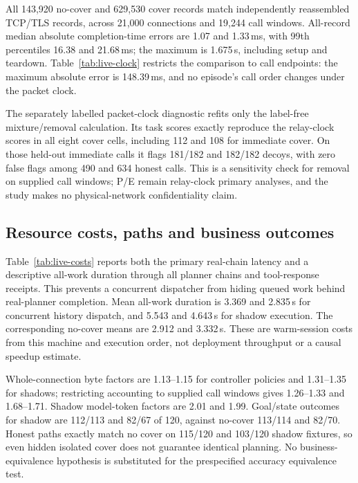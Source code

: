 All 143,920 no-cover and 629,530 cover records match independently reassembled TCP/TLS records, across 21,000 connections and 19,244 call windows. All-record median absolute completion-time errors are 1.07 and 1.33\,ms, with 99th percentiles 16.38 and 21.68\,ms; the maximum is 1.675\,s, including setup and teardown. Table~\ref{tab:live-clock} restricts the comparison to call endpoints: the maximum absolute error is 148.39\,ms, and no episode's call order changes under the packet clock.

The separately labelled packet-clock diagnostic refits only the label-free mixture/removal calculation. Its task scores exactly reproduce the relay-clock scores in all eight cover cells, including 112 and 108 for immediate cover. On those held-out immediate calls it flags 181/182 and 182/182 decoys, with zero false flags among 490 and 634 honest calls. This is a sensitivity check for removal on supplied call windows; P/E remain relay-clock primary analyses, and the study makes no physical-network confidentiality claim.




\subsection{Resource costs, paths and business outcomes}
Table~\ref{tab:live-costs} reports both the primary real-chain latency and a descriptive all-work duration through all planner chains and tool-response receipts. This prevents a concurrent dispatcher from hiding queued work behind real-planner completion. Mean all-work duration is 3.369 and 2.835\,s for concurrent history dispatch, and 5.543 and 4.643\,s for shadow execution. The corresponding no-cover means are 2.912 and 3.332\,s. These are warm-session costs from this machine and execution order, not deployment throughput or a causal speedup estimate.

Whole-connection byte factors are 1.13--1.15 for controller policies and 1.31--1.35 for shadows; restricting accounting to supplied call windows gives 1.26--1.33 and 1.68--1.71. Shadow model-token factors are 2.01 and 1.99. Goal/state outcomes for shadow are 112/113 and 82/67 of 120, against no-cover 113/114 and 82/70. Honest paths exactly match no cover on 115/120 and 103/120 shadow fixtures, so even hidden isolated cover does not guarantee identical planning. No business-equivalence hypothesis is substituted for the prespecified accuracy equivalence test.

